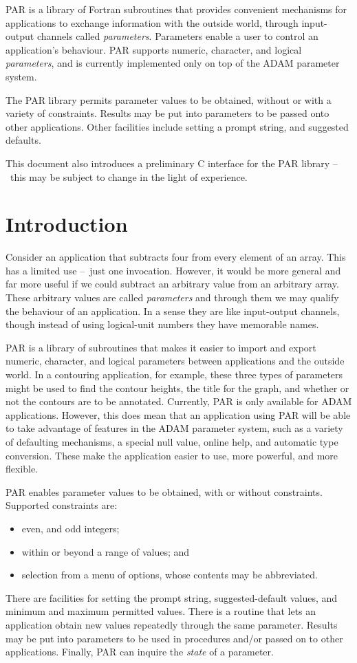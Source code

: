 \documentclass[twoside,11pt]{article}
\newcommand{\stardocinitials}  {SUN}
\newcommand{\stardocnumber}    {114.4}
\newcommand{\stardocabstract}  {PAR is a library of Fortran subroutines that 
provides convenient mechanisms for applications to exchange information with 
the outside world, through input-output channels called {\em parameters\/}.  
Parameters enable a
user to control an application's behaviour.  PAR supports numeric,
character, and logical {\em parameters}, and is currently implemented
only on top of the {\footnotesize ADAM} parameter system. 
\par
The PAR library permits parameter values to be obtained, without or with
a variety of constraints.  Results may be put into parameters to
be passed onto other applications.  Other facilities include setting a prompt
string, and suggested defaults.  
\par
This document also introduces a preliminary C interface for the PAR library
\dash\ this may be subject to change in the light of experience.

}
\newcommand{\stardocname}{\stardocinitials /\stardocnumber}
\newenvironment{latexonly}{}{}
\newcommand{\xlabel}[1]{}
\newcommand{\dash}{--}
\newcommand{\dash}{-}
\renewcommand{\thepage}{\roman{page}}
\begin{document}
\stardocabstract
  \newpage
  \begin{latexonly}
    \setlength{\parskip}{0mm}
    \tableofcontents
    \setlength{\parskip}{\medskipamount}
    \markboth{\stardocname}{\stardocname}
  \end{latexonly}
\cleardoublepage
\renewcommand{\thepage}{\arabic{page}}
\setcounter{page}{1}

\section{\xlabel{introduction}Introduction}

Consider an application that subtracts four from every element of an
array.  This has a limited use \dash\ just one invocation.  However, it would
be more general and far more useful if we could subtract an arbitrary
value from an arbitrary array.  These arbitrary values are called {\em
parameters\/} and through them we may qualify the behaviour of an
application.  In a sense they are like input-output channels, though
instead of using logical-unit numbers they have memorable names. 

PAR is a library of subroutines that makes it easier to import and
export numeric, character, and logical parameters between applications
and the outside world.  In a contouring application, for example, these
three types of parameters might be used to find the contour heights, the
title for the graph, and whether or not the contours are to be
annotated. Currently, PAR is only available for {\footnotesize ADAM}
applications.  However, this does mean that an application using PAR
will be able to take advantage of features in the {\footnotesize ADAM}
parameter system, such as a variety of defaulting mechanisms, a special
null value, online help, and automatic type conversion.  These make the
application easier to use, more powerful, and more flexible. 

PAR enables parameter values to be obtained, with or without
constraints.  Supported constraints are: 
\begin{itemize}
\item even, and odd integers;
\item within or beyond a range of values; and
\item selection from a menu of options,
whose contents may be abbreviated. 
\end{itemize}
There are facilities for setting the prompt string, suggested-default
values, and minimum and maximum permitted values. There is a routine
that lets an application obtain new values repeatedly through the same
parameter.  Results may be put into parameters to be used in procedures
and/or passed on to other applications.  Finally, PAR can inquire the
{\em state\/} of a parameter.
\end{document}
